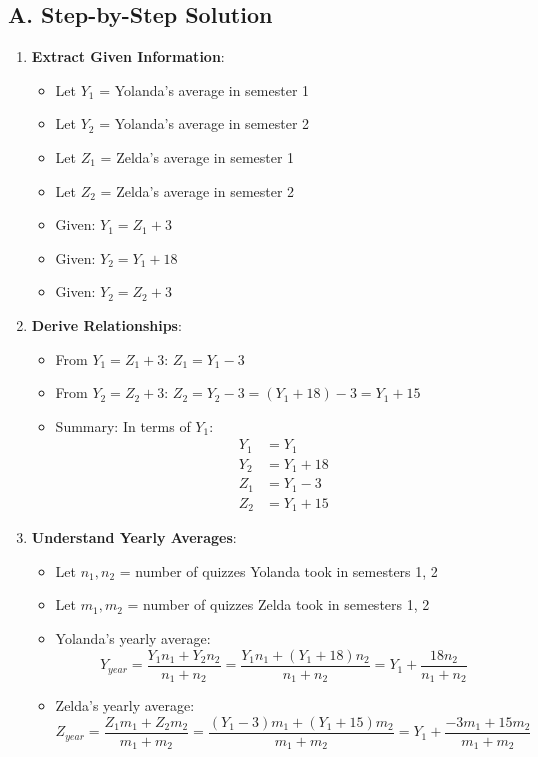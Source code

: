 \documentclass[12pt]{article}
\begin{document}
\begin{solutionbox}
\subsection*{A. Step-by-Step Solution}
\begin{enumerate}[leftmargin=*]
    \item \textbf{Extract Given Information}: 
    \begin{itemize}
        \item Let $Y_1$ = Yolanda's average in semester 1
        \item Let $Y_2$ = Yolanda's average in semester 2
        \item Let $Z_1$ = Zelda's average in semester 1
        \item Let $Z_2$ = Zelda's average in semester 2
        \item Given: $Y_1 = Z_1 + 3$
        \item Given: $Y_2 = Y_1 + 18$
        \item Given: $Y_2 = Z_2 + 3$
    \end{itemize}
    
    \item \textbf{Derive Relationships}: 
    \begin{itemize}
        \item From $Y_1 = Z_1 + 3$: $Z_1 = Y_1 - 3$
        \item From $Y_2 = Z_2 + 3$: $Z_2 = Y_2 - 3 = (Y_1 + 18) - 3 = Y_1 + 15$
        \item Summary: In terms of $Y_1$:
        \begin{align}
        Y_1 &= Y_1\\
        Y_2 &= Y_1 + 18\\
        Z_1 &= Y_1 - 3\\
        Z_2 &= Y_1 + 15
        \end{align}
    \end{itemize}
    
    \item \textbf{Understand Yearly Averages}: 
    \begin{itemize}
        \item Let $n_1, n_2$ = number of quizzes Yolanda took in semesters 1, 2
        \item Let $m_1, m_2$ = number of quizzes Zelda took in semesters 1, 2
        \item Yolanda's yearly average:
        \[Y_{year} = \frac{Y_1 n_1 + Y_2 n_2}{n_1 + n_2} = \frac{Y_1 n_1 + (Y_1 + 18)n_2}{n_1 + n_2} = Y_1 + \frac{18n_2}{n_1 + n_2}\]
        \item Zelda's yearly average:
        \[Z_{year} = \frac{Z_1 m_1 + Z_2 m_2}{m_1 + m_2} = \frac{(Y_1-3)m_1 + (Y_1+15)m_2}{m_1 + m_2} = Y_1 + \frac{-3m_1 + 15m_2}{m_1 + m_2}\]
    \end{itemize}
    

\end{enumerate}
\end{solutionbox}
\end{document}
